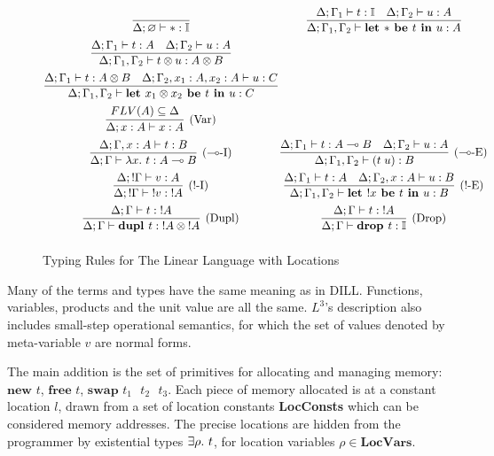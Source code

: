 \documentclass[]{unswthesis}
\let\emptyset\varnothing
\newcommand{\Exists}[1]{\exists #1 \ldotp \,}
\newcommand{\lam}[1]{\lambda #1 \ldotp \,}
\newcommand{\app}[2]{(#1 \; #2)}
\newcommand{\lolly}{\multimap}
\newcommand{\types}{\vdash}
\newcommand{\letbe}[3]{\textbf{let $#1$ be $#2$ in $#3$}}
\newcommand{\dupl}[1]{\textbf{dupl $#1$}}
\newcommand{\drop}[1]{\textbf{drop $#1$}}
\newcommand{\lnew}[1]{\textbf{new $#1$}}
\newcommand{\lfree}[1]{\textbf{free $#1$}}
\newcommand{\lswap}[3]{\textbf{swap $#1$ $#2$ $#3$}}
\let\b\textbf
\let\t\text
\begin{document}
\begin{figure}[h]
\caption{Typing Rules for The Linear Language with Locations}
\label{l3_typing}
\begin{displaymath}
\arraycolsep=1.2pt\def\arraystretch{2.2}
\begin{array}{cc}
\infer{\Delta; \emptyset \types * : \mathbb{I}}{} &
\infer{\Delta; \Gamma_1, \Gamma_2 \types \letbe{*}{t}{u} : A}{
  \Delta; \Gamma_1 \types t : \mathbb{I}  &  \Delta; \Gamma_2 \types u : A
} \\
\infer{\Delta; \Gamma_1, \Gamma_2 \types t \otimes u : A \otimes B}{
  \Delta; \Gamma_1 \types t : A  &  \Delta; \Gamma_2 \types u : A
}\\
\infer
{\Delta; \Gamma_1, \Gamma_2 \types \letbe{x_1 \otimes x_2}{t}{u} : C}
{\Delta; \Gamma_1 \types t : A \otimes B  &
 \Delta; \Gamma_2, x_1 : A, x_2 : A \types u : C}\\
\infer[\t{(Var)}]{\Delta; x : A \types x : A}{FLV(A) \subseteq \Delta}\\
\infer[\t{($\lolly$-I)}]{\Delta; \Gamma \types \lam{x} t : A \lolly B}{
  \Delta; \Gamma, x : A \types t : B
} &
\infer[\t{($\lolly$-E)}]{\Delta; \Gamma_1, \Gamma_2 \types \app{t}{u} : B}{
  \Delta; \Gamma_1 \types t : A \lolly B  &  \Delta; \Gamma_2 \types u : A
} \\
\infer[\t{(!-I)}]{\Delta; !\Gamma \types {!v} : {!A}}{\Delta; !\Gamma \types v : A} &
\infer[\t{(!-E)}]{\Delta; \Gamma_1, \Gamma_2 \types \letbe{!x}{t}{u} : B}{
  \Delta; \Gamma_1 \types t : A  &  \Delta; \Gamma_2, x : A \types u : B
}\\
\infer[\t{(Dupl)}]{\Delta; \Gamma \types \dupl{t} : {!A} \otimes {!A}}{
  \Delta; \Gamma \types t : {!A}
} &
\infer[\t{(Drop)}]{\Delta; \Gamma \types \drop{t} : \mathbb{I}}{
  \Delta; \Gamma \types t : {!A}
}
\end{array}
\end{displaymath}
\end{figure}

Many of the terms and types have the same meaning as in DILL. Functions, variables, products and the unit value are all the same. $L^3$'s description also includes small-step operational semantics, for which the set of values denoted by meta-variable $v$ are normal forms.


The main addition is the set of primitives for allocating and managing memory: $\lnew{t}$, $\lfree{t}$, $\lswap{t_1}{t_2}{t_3}$. Each piece of memory allocated is at a constant location $l$, drawn from a set of location constants \b{LocConsts} which can be considered memory addresses. The precise locations are hidden from the programmer by existential types $\Exists{\rho} t$, for location variables $\rho \in \b{LocVars}$.
\end{document}

